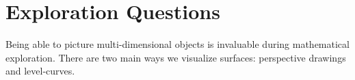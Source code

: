 \newpage
\section*{Exploration Questions}

	Being able to picture multi-dimensional objects is 
	invaluable during mathematical exploration.  There are two main ways we visualize
	surfaces: perspective drawings and level-curves.
